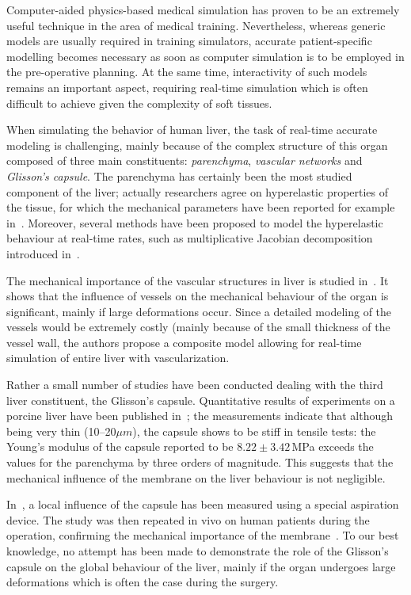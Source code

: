 \documentclass[final,3p,times,twocolumn]{elsarticle}
\begin{document}
Computer-aided physics-based medical simulation has proven to be an extremely useful technique in the area of medical training. 
Nevertheless, whereas generic models are usually required in training simulators, accurate patient-specific modelling
becomes necessary as soon as computer simulation is to be employed in the pre-operative planning. At the same time, 
interactivity of such models remains an important aspect, requiring real-time simulation which is often difficult to 
achieve given the complexity of soft tissues. 

When simulating the behavior of human liver, the task of real-time accurate modeling is challenging, mainly because of the complex structure 
of this organ composed of three main constituents: \emph{parenchyma}, \emph{vascular networks} and \emph{Glisson's capsule}.
The parenchyma has certainly been the most studied component of the liver; actually researchers agree on hyperelastic 
properties of the tissue, for which the mechanical parameters have been reported for example in~\cite{Kerdok2006,Gao2009}. 
Moreover, several methods have been proposed to model the hyperelastic behaviour at real-time rates, such as multiplicative Jacobian decomposition
introduced in~\cite{Marchesseau2010}.

The mechanical importance of the vascular structures in liver is studied in~\cite{Peterlik2012}. It shows that the 
influence of vessels on the mechanical behaviour of the organ is significant, mainly if large deformations occur. 
Since a detailed modeling of the vessels would be extremely costly (mainly because of the small thickness of the vessel wall, 
the authors propose a composite model allowing for real-time simulation of entire liver with vascularization.

Rather a small number of studies have been conducted dealing with the third liver constituent, the  Glisson's capsule.
Quantitative results of experiments on a porcine liver have been published in~\cite{Umale2011}; the measurements indicate that although being very 
thin (10--20$\mu m$), the capsule shows to be stiff in tensile tests: the Young's modulus of the capsule reported to be $8.22\pm3.42$\,MPa 
exceeds the values for the parenchyma by three orders of magnitude.
This suggests that the mechanical influence of the membrane on the liver behaviour is not negligible.

In~\cite{Hollenstein2006}, a local influence of the capsule has been measured using a special aspiration device. The study was then repeated 
in vivo on human patients during the operation, confirming the mechanical importance of the membrane~\cite{Ahn2010,Nava2008}.
To our best knowledge, no attempt has been made to demonstrate the role of the Glisson's capsule on the global behaviour of 
the liver, mainly if the organ undergoes large deformations which is often the case during the surgery.
\end{document}
